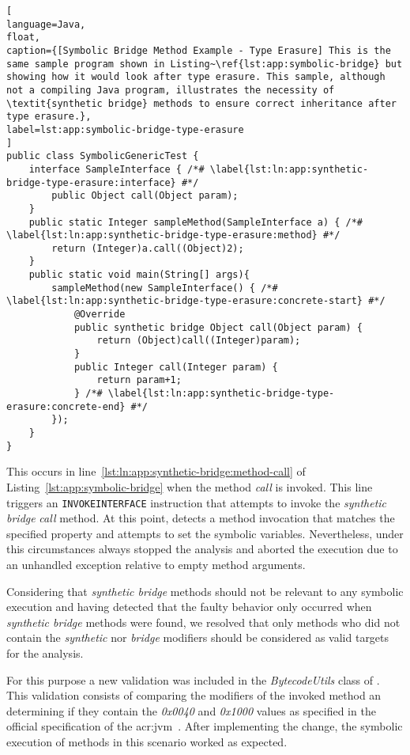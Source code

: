 \begin{lstlisting}[
language=Java,
float,
caption={[Symbolic Bridge Method Example - Type Erasure] This is the same sample program shown in Listing~\ref{lst:app:symbolic-bridge} but showing how it would look after type erasure. This sample, although not a compiling Java program, illustrates the necessity of \textit{synthetic bridge} methods to ensure correct inheritance after type erasure.},
label=lst:app:symbolic-bridge-type-erasure
]
public class SymbolicGenericTest {
	interface SampleInterface { /*# \label{lst:ln:app:synthetic-bridge-type-erasure:interface} #*/
		public Object call(Object param); 
	}
	public static Integer sampleMethod(SampleInterface a) { /*# \label{lst:ln:app:synthetic-bridge-type-erasure:method} #*/
		return (Integer)a.call((Object)2);
	}
	public static void main(String[] args){
		sampleMethod(new SampleInterface() { /*# \label{lst:ln:app:synthetic-bridge-type-erasure:concrete-start} #*/
			@Override
			public synthetic bridge Object call(Object param) {
				return (Object)call((Integer)param);
			}
			public Integer call(Integer param) {				
				return param+1;
			} /*# \label{lst:ln:app:synthetic-bridge-type-erasure:concrete-end} #*/
		});
	}
}
\end{lstlisting}

This occurs in line~\ref{lst:ln:app:synthetic-bridge:method-call} of Listing~\ref{lst:app:symbolic-bridge} when the method \textit{call} is invoked. This line triggers an \texttt{INVOKEINTERFACE} instruction that attempts to invoke the \textit{synthetic bridge} \textit{call} method. At this point, \spf{} detects a method invocation that matches the specified property and attempts to set the symbolic variables. Nevertheless, under this circumstances \spf{} always stopped the analysis and aborted the execution due to an unhandled exception relative to empty method arguments.

Considering that \textit{synthetic bridge} methods should not be relevant to any symbolic execution and having detected that the faulty behavior only occurred when \textit{synthetic bridge} methods were found, we resolved that only methods who did not contain the \textit{synthetic} nor \textit{bridge} modifiers should be considered as valid targets for the analysis.

For this purpose a new validation was included in the \textit{BytecodeUtils} class of \spf{}. This validation consists of comparing the modifiers of the invoked method an determining if they contain the \textit{0x0040} and \textit{0x1000} values as specified in the official specification of the \acrshort{acr:jvm}~\cite{Lindholm2014}. After implementing the change, the symbolic execution of methods in this scenario worked as expected. 

